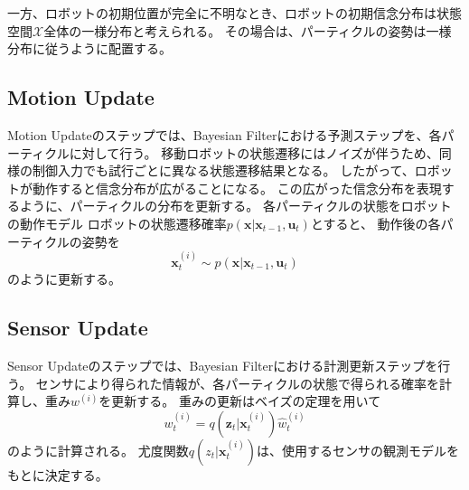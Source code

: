 一方、ロボットの初期位置が完全に不明なとき、ロボットの初期信念分布は状態空間$\mathcal{X}$全体の一様分布と考えられる。
その場合は、パーティクルの姿勢は一様分布に従うように配置する。



\subsection{Motion Update}

Motion Updateのステップでは、Bayesian Filterにおける予測ステップを、各パーティクルに対して行う。
移動ロボットの状態遷移にはノイズが伴うため、同様の制御入力でも試行ごとに異なる状態遷移結果となる。
したがって、ロボットが動作すると信念分布が広がることになる。
この広がった信念分布を表現するように、パーティクルの分布を更新する。
各パーティクルの状態をロボットの動作モデル
ロボットの状態遷移確率$p(\bm{x} | \bm{x}_{t-1}, \bm{u}_{t})$とすると、
動作後の各パーティクルの姿勢を
\begin{equation}
\label{particle trans prob}
  \bm{x}^{(i)}_{t} \sim p(\bm{x} | \bm{x}_{t-1}, \bm{u}_{t})
\end{equation}
のように更新する。


\subsection{Sensor Update}

Sensor Updateのステップでは、Bayesian Filterにおける計測更新ステップを行う。
センサにより得られた情報が、各パーティクルの状態で得られる確率を計算し、重み$w^{(i)}$を更新する。
重みの更新はベイズの定理を用いて
\begin{equation}
\label{weight}
  w^{(i)}_{t} = q(\bm{z}_{t} | \bm{x}^{(i)}_{t}) \hat{w}^{(i)}_{t}
\end{equation}
のように計算される。
尤度関数$q(z_{t} | \bm{x}^{(i)}_{t})$は、使用するセンサの観測モデルをもとに決定する。

